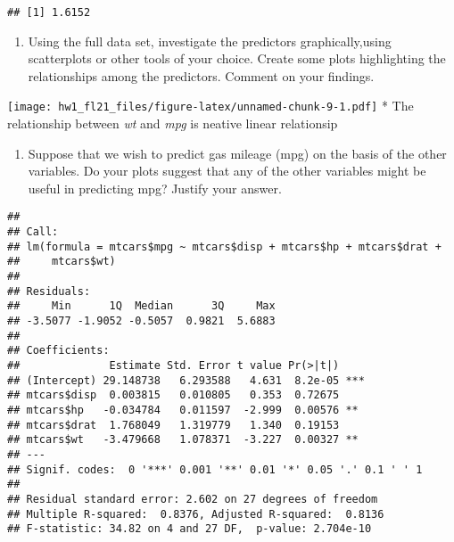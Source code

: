 \documentclass[
]{article}
\newenvironment{Shaded}{\begin{snugshade}}{\end{snugshade}}
\newcommand{\FunctionTok}[1]{\textcolor[rgb]{0.00,0.00,0.00}{#1}}
\newcommand{\NormalTok}[1]{#1}
\newcommand{\OtherTok}[1]{\textcolor[rgb]{0.56,0.35,0.01}{#1}}
\newcommand{\SpecialCharTok}[1]{\textcolor[rgb]{0.00,0.00,0.00}{#1}}
\providecommand{\tightlist}{%
  \setlength{\itemsep}{0pt}\setlength{\parskip}{0pt}}
\begin{document}
\begin{verbatim}
## [1] 1.6152
\end{verbatim}

\begin{enumerate}
\def\labelenumi{(\alph{enumi})}
\setcounter{enumi}{4}
\tightlist
\item
  Using the full data set, investigate the predictors graphically,using
  scatterplots or other tools of your choice. Create some plots
  highlighting the relationships among the predictors. Comment on your
  findings.
\end{enumerate}

\begin{Shaded}
\end{Shaded}

\texttt{[image: hw1\_fl21\_files/figure-latex/unnamed-chunk-9-1.pdf]} *
The relationship between \emph{wt} and \emph{mpg} is neative linear
relationsip

\begin{enumerate}
\def\labelenumi{(\alph{enumi})}
\setcounter{enumi}{5}
\tightlist
\item
  Suppose that we wish to predict gas mileage (mpg) on the basis of the
  other variables. Do your plots suggest that any of the other variables
  might be useful in predicting mpg? Justify your answer.
\end{enumerate}

\begin{Shaded}
\end{Shaded}

\begin{verbatim}
## 
## Call:
## lm(formula = mtcars$mpg ~ mtcars$disp + mtcars$hp + mtcars$drat + 
##     mtcars$wt)
## 
## Residuals:
##     Min      1Q  Median      3Q     Max 
## -3.5077 -1.9052 -0.5057  0.9821  5.6883 
## 
## Coefficients:
##              Estimate Std. Error t value Pr(>|t|)    
## (Intercept) 29.148738   6.293588   4.631  8.2e-05 ***
## mtcars$disp  0.003815   0.010805   0.353  0.72675    
## mtcars$hp   -0.034784   0.011597  -2.999  0.00576 ** 
## mtcars$drat  1.768049   1.319779   1.340  0.19153    
## mtcars$wt   -3.479668   1.078371  -3.227  0.00327 ** 
## ---
## Signif. codes:  0 '***' 0.001 '**' 0.01 '*' 0.05 '.' 0.1 ' ' 1
## 
## Residual standard error: 2.602 on 27 degrees of freedom
## Multiple R-squared:  0.8376, Adjusted R-squared:  0.8136 
## F-statistic: 34.82 on 4 and 27 DF,  p-value: 2.704e-10
\end{verbatim}
\end{document}

